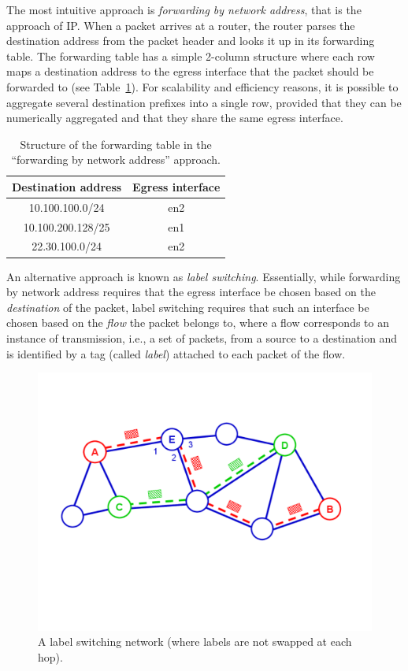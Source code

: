 \documentclass{article}
\newcommand{\remove}[1]{}
\begin{document}
The most intuitive approach is \emph{forwarding by network address}, that is the 
approach of IP. When a packet arrives at a router, the router parses the 
destination address from the packet header and looks it up in its forwarding 
table. The forwarding table has a simple 2-column structure where each row maps 
a destination address to the egress interface that the packet should be 
forwarded to (see Table~\ref{tab:fib-destination}). For scalability and 
efficiency reasons, it is possible to aggregate several destination prefixes 
into a single row, provided that they can be numerically aggregated and that 
they share the same egress interface.

\begin{table}
 \centering
 \begin{tabular}{|c|c|}
 \hline
 \textbf{Destination address} & \textbf{Egress interface} \\
 \hline
 10.100.100.0/24 & en2 \\
 \hline
 10.100.200.128/25 & en1 \\
 \hline  
 22.30.100.0/24 & en2 \\
 \hline \end{tabular}
 \caption{Structure of the forwarding table in the ``forwarding by network 
address'' approach.}
 \label{tab:fib-destination}
\end{table}

An alternative approach is known as \emph{label switching}\remove{, that is the approach of MPLS}. 
Essentially, while forwarding by network address requires that the egress 
interface be chosen based on the \emph{destination} of the packet, label 
switching requires that such an interface be chosen based on the \emph{flow} 
the packet belongs to, where a flow corresponds to an instance of transmission, i.e., a set of
packets, from a source to a destination and is identified by a tag (called \emph{label})
attached to each packet of the flow.

\begin{figure}
\centering  %
 \includegraphics[trim=1cm 7cm 2cm 4cm, clip=true,width=0.7\columnwidth]{figures/reti-slides-0}
 \caption{A label switching network (where labels are not swapped at each hop).}
 \label{fig:reti-slides-0}
\end{figure}
\end{document}
